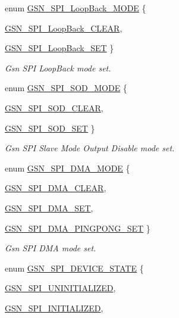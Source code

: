 \begin{DoxyCompactItemize}
enum \hyperlink{a00655_ga64d5d284cb01ecc3c94f83cd0b22fea0}{GSN\_\-SPI\_\-LoopBack\_\-MODE} \{ \par
\hyperlink{a00655_gga64d5d284cb01ecc3c94f83cd0b22fea0ab2884bcbedf7d7d0637f3298d9a33eb2}{GSN\_\-SPI\_\-LoopBack\_\-CLEAR}, 
\par
\hyperlink{a00655_gga64d5d284cb01ecc3c94f83cd0b22fea0a53a6810aebddcfe97652d9a46a40cfb5}{GSN\_\-SPI\_\-LoopBack\_\-SET}
 \}
\begin{DoxyCompactList}\small\item\em Gsn SPI LoopBack mode set. \end{DoxyCompactList}\item 
enum \hyperlink{a00655_gad8f5cb14958ae6607aad0159bf3dc5b4}{GSN\_\-SPI\_\-SOD\_\-MODE} \{ \par
\hyperlink{a00655_ggad8f5cb14958ae6607aad0159bf3dc5b4a673eb4658e63e9f7e81ac858cb1ca076}{GSN\_\-SPI\_\-SOD\_\-CLEAR}, 
\par
\hyperlink{a00655_ggad8f5cb14958ae6607aad0159bf3dc5b4a08dc6552a27eca2fd23133ced3938f1a}{GSN\_\-SPI\_\-SOD\_\-SET}
 \}
\begin{DoxyCompactList}\small\item\em Gsn SPI Slave Mode Output Disable mode set. \end{DoxyCompactList}\item 
enum \hyperlink{a00655_ga5877a1a4dee99757a5560a974edd42ca}{GSN\_\-SPI\_\-DMA\_\-MODE} \{ \par
\hyperlink{a00655_gga5877a1a4dee99757a5560a974edd42caa57592c04bb258333fb01f83deb98b703}{GSN\_\-SPI\_\-DMA\_\-CLEAR}, 
\par
\hyperlink{a00655_gga5877a1a4dee99757a5560a974edd42caa92f7215f44c8faf04067cc9d500d1d53}{GSN\_\-SPI\_\-DMA\_\-SET}, 
\par
\hyperlink{a00655_gga5877a1a4dee99757a5560a974edd42caa83c30d5653f56066a6b49c07dc5f4222}{GSN\_\-SPI\_\-DMA\_\-PINGPONG\_\-SET}
 \}
\begin{DoxyCompactList}\small\item\em Gsn SPI DMA mode set. \end{DoxyCompactList}\item 
enum \hyperlink{a00587_acadb33517f6f254dce30d69f644a88c6}{GSN\_\-SPI\_\-DEVICE\_\-STATE} \{ \par
\hyperlink{a00587_acadb33517f6f254dce30d69f644a88c6a023a942bf5aeb94d6cd788b1d4f8ce6f}{GSN\_\-SPI\_\-UNINITIALIZED}, 
\par
\hyperlink{a00587_acadb33517f6f254dce30d69f644a88c6a7ad688ca0363ab4e282a92ef540b68d5}{GSN\_\-SPI\_\-INITIALIZED}, 

\end{DoxyCompactItemize}
